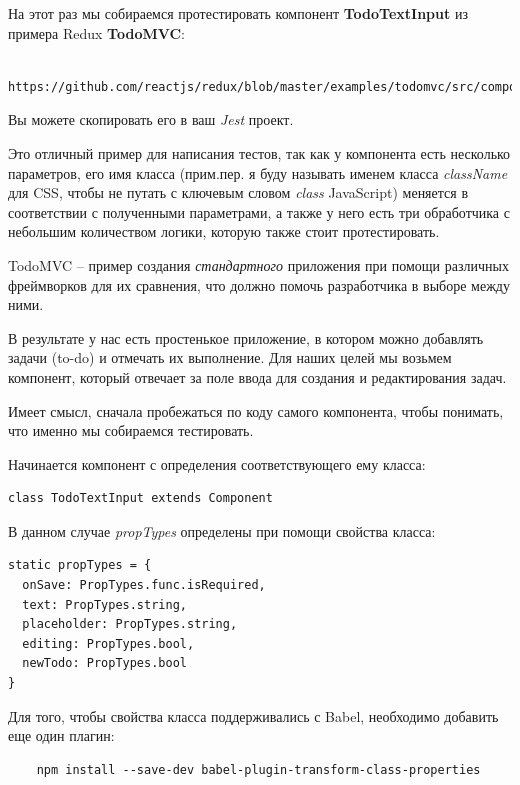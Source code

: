 На этот раз мы собираемся протестировать компонент \textbf{TodoTextInput} из примера Redux \textbf{TodoMVC}:

\begin{lstlisting}
	https://github.com/reactjs/redux/blob/master/examples/todomvc/src/components/TodoTextInput.js
\end{lstlisting}

Вы можете скопировать его в ваш \textit{Jest} проект.

Это отличный пример для написания тестов, так как у компонента есть несколько параметров, его имя класса (прим.пер. я буду называть именем класса \textit{className} для CSS, чтобы не путать с ключевым словом \textit{class} JavaScript) меняется в соответствии с полученными параметрами, а также у него есть три обработчика с небольшим количеством логики, которую также стоит протестировать.

TodoMVC -- пример создания \textit{стандартного} приложения при помощи различных фреймворков для их сравнения, что должно помочь разработчика в выборе между ними.

В результате у нас есть простенькое приложение, в котором можно добавлять задачи (to-do) и отмечать их выполнение. Для наших целей мы возьмем компонент, который отвечает за поле ввода для создания и редактирования задач. 

Имеет смысл, сначала пробежаться по коду самого компонента, чтобы понимать, что именно мы собираемся тестировать.

Начинается компонент с определения соответствующего ему класса:

\begin{lstlisting}
class TodoTextInput extends Component
\end{lstlisting}

В данном случае \textit{propTypes} определены при помощи свойства класса:

\begin{lstlisting}
static propTypes = {
  onSave: PropTypes.func.isRequired,
  text: PropTypes.string,
  placeholder: PropTypes.string,
  editing: PropTypes.bool,
  newTodo: PropTypes.bool
}
\end{lstlisting}

Для того, чтобы свойства класса поддерживались с Babel, необходимо добавить еще один плагин:

\begin{lstlisting}
	npm install --save-dev babel-plugin-transform-class-properties
\end{lstlisting}

